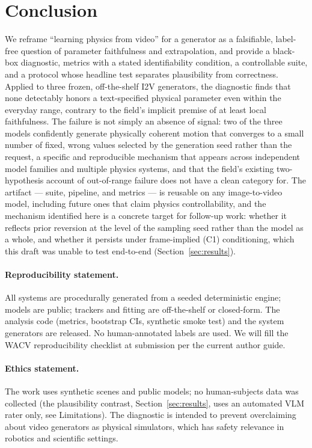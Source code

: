 \section{Conclusion}
We reframe ``learning physics from video'' for a generator as a falsifiable,
label-free question of parameter faithfulness and extrapolation, and provide a
black-box diagnostic, metrics with a stated identifiability condition, a
controllable suite, and a protocol whose headline test separates plausibility
from correctness. Applied to three frozen, off-the-shelf I2V generators, the
diagnostic finds that none detectably honors a text-specified physical
parameter even within the everyday range, contrary to the field's implicit
premise of at least local faithfulness. The failure is not simply an absence
of signal: two of the three models confidently generate physically coherent
motion that converges to a small number of fixed, wrong values selected by
the generation seed rather than the request, a specific and reproducible
mechanism that appears across independent model families and multiple
physics systems, and that the field's existing two-hypothesis account of
out-of-range failure does not have a clean category for. The artifact ---
suite, pipeline, and metrics --- is reusable on any image-to-video model,
including future ones that claim physics controllability, and the mechanism
identified here is a concrete target for follow-up work: whether it reflects
prior reversion at the level of the sampling seed rather than the model as a
whole, and whether it persists under frame-implied (C1) conditioning, which
this draft was unable to test end-to-end (Section~\ref{sec:results}).

\paragraph{Reproducibility statement.}
All systems are procedurally generated from a seeded deterministic engine;
models are public; trackers and fitting are off-the-shelf or closed-form. The
analysis code (metrics, bootstrap CIs, synthetic smoke test) and the system
generators are released. No human-annotated labels are used. We will fill the
WACV reproducibility checklist at submission per the current author guide.

\paragraph{Ethics statement.}
The work uses synthetic scenes and public models; no human-subjects data was
collected (the plausibility contrast, Section~\ref{sec:results}, uses an
automated VLM rater only, see Limitations). The diagnostic is intended to
prevent overclaiming about video generators as physical simulators, which
has safety relevance in robotics and scientific settings.

